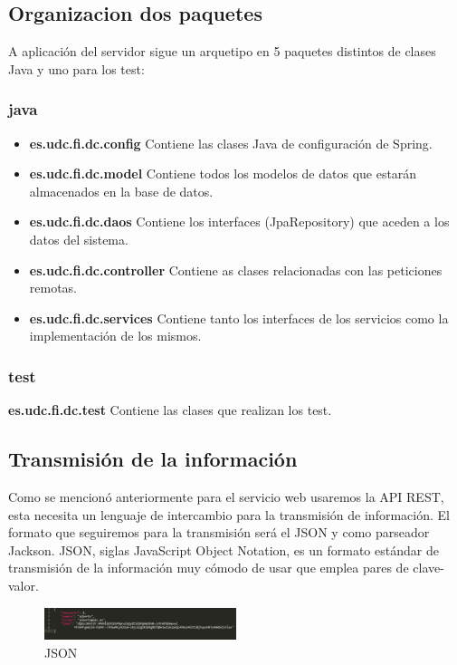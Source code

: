 \subsection{Organizacion dos paquetes}
A aplicación del servidor sigue un arquetipo en 5 paquetes distintos de clases Java y uno para los test:
\subsubsection{java}
\begin{itemize}
\item\textbf{ es.udc.fi.dc.config} Contiene las clases Java de configuración de Spring.
\item \textbf{es.udc.fi.dc.model} Contiene todos los modelos de datos que estarán almacenados en la base de datos.
\item \textbf{es.udc.fi.dc.daos} Contiene los interfaces (JpaRepository) que aceden a los datos del sistema.
\item \textbf{es.udc.fi.dc.controller} Contiene as clases relacionadas  con las peticiones remotas.
\item  \textbf{es.udc.fi.dc.services} Contiene tanto los interfaces de los servicios como la implementación de los mismos.


\end{itemize}
\subsubsection{test}

\textbf{es.udc.fi.dc.test} Contiene las clases que realizan los test.
\subsection{Transmisión de la información}
Como se mencionó anteriormente para el servicio web usaremos la API REST, esta necesita un lenguaje de intercambio para la transmisión de información. El formato que seguiremos para la transmisión será el JSON y como parseador Jackson.
JSON, siglas JavaScript Object Notation, es un formato estándar de transmisión de la información muy cómodo de usar que emplea pares de clave-valor.



	\begin{figure}[H]
		\centering
		\includegraphics[width=0.5\textwidth] {json.PNG}
		\caption{JSON }
	\end{figure}
